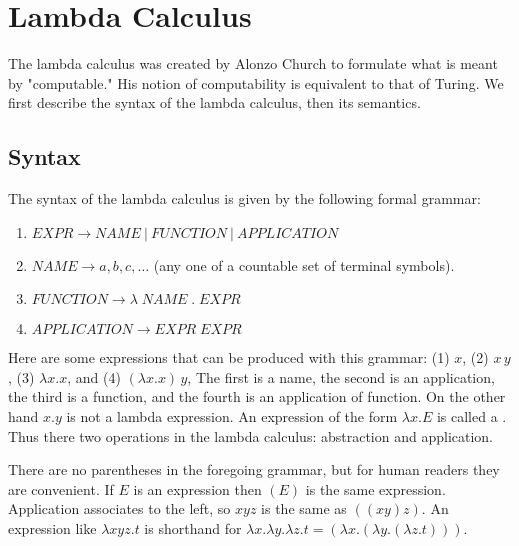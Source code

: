 

\section{Lambda Calculus}


\innertableofcontents

The lambda calculus was created by Alonzo Church to formulate what is meant by "computable."  His notion of computability is equivalent to that of Turing.   We first describe the syntax of the lambda calculus, then its semantics.


\subsection{Syntax}

The syntax of the lambda calculus is given by the following formal grammar:

\begin{enumerate}

\item $EXPR \to NAME\ |\ FUNCTION\ |\ APPLICATION$

\item $NAME \to a, b, c, \ldots$ (any one of a countable set of terminal symbols).

\item $FUNCTION \to\lambda\; NAME\; .\; EXPR$

\item $APPLICATION \to EXPR\; EXPR$

\end{enumerate}

Here are some expressions that can be produced with this grammar: (1) $x$, (2) $x\, y$, (3) $\lambda x.x$, and (4) $(\lambda x.x)\,y$, The first is a name, the second is an application, the third is a function, and the fourth is an application of function.  On the other hand $x . y$ is not a lambda expression.  An expression of the form $\lambda x.E$ is called a .  Thus there two operations in the lambda calculus: abstraction and application.

There are no parentheses in the foregoing grammar, but for human readers they are convenient. If $E$ is an expression then $(E)$ is the same expression.  Application associates to the left, so $xyz$ is the same as $((xy)z)$.  An expression like $\lambda xyz.t$ is shorthand for $\lambda x. \lambda y. \lambda z.t = (\lambda x. (\lambda y. (\lambda z.t)))$.

